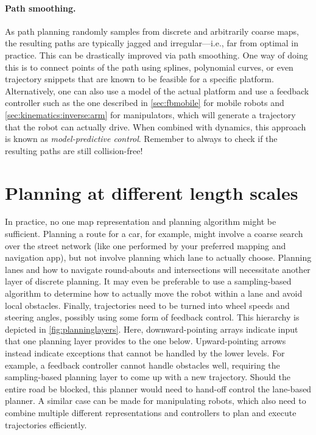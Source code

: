 \paragraph{Path smoothing.}

As path planning randomly samples from discrete and arbitrarily coarse maps, the resulting paths are typically jagged and irregular---i.e., far from optimal in practice. This can be drastically improved via path smoothing. One way of doing this is to connect points of the path using splines, polynomial curves, or even trajectory snippets that are known to be feasible for a specific platform. Alternatively, one can also use a model of the actual platform and use a feedback controller such as the one described in \cref{sec:fbmobile} for mobile robots and \cref{sec:kinematics:inverse:arm} for manipulators, which will generate a trajectory that the robot can actually drive.
When combined with dynamics, this approach is known as \textsl{model-predictive control}. Remember to always to check if the resulting paths are still collision-free!

\section{Planning at different length scales}
In practice, no one map representation and planning algorithm might be sufficient. Planning a route for a car, for example, might involve a coarse search over the street network (like one performed by your preferred mapping and navigation app), but not involve planning which lane to actually choose. Planning lanes and how to navigate round-abouts and intersections will necessitate another layer of discrete planning. It may even be preferable to use a sampling-based algorithm to determine how to actually move the robot within a lane and avoid local obstacles. Finally, trajectories need to be turned into wheel speeds and steering angles, possibly using some form of feedback control. This hierarchy is depicted in \cref{fig:planninglayers}. Here, downward-pointing arrays indicate input that one planning layer provides to the one below. Upward-pointing arrows instead indicate exceptions that cannot be handled by the lower levels. For example, a feedback controller cannot handle obstacles well, requiring the sampling-based planning layer to come up with a new trajectory. Should the entire road be blocked, this planner would need to hand-off control the lane-based planner. A similar case can be made for manipulating robots, which also need to combine multiple different representations and controllers to plan and execute trajectories efficiently.

